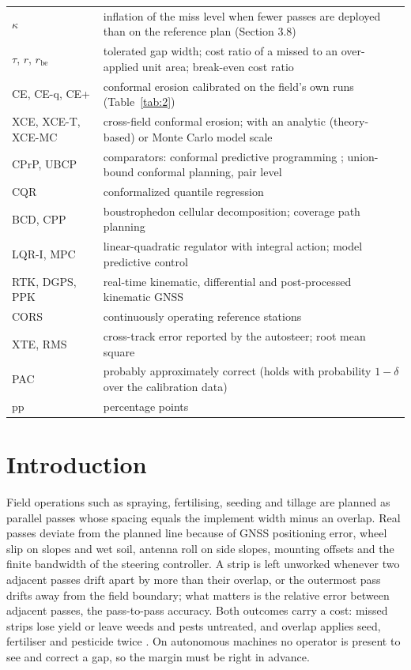 \documentclass[preprint,12pt,authoryear]{elsarticle}
\begin{document}
{\begin{tabularx}{\textwidth}{@{}>{\raggedright\arraybackslash}p{}X@{}}
\(\kappa\) & inflation of the miss level when fewer passes are deployed than on the reference plan (Section 3.8) \\
\(\tau\), \(r\), \(r_\mathrm{be}\) & tolerated gap width; cost ratio of a missed to an over-applied unit area; break-even cost ratio \\
CE, CE-q, CE+ & conformal erosion calibrated on the field's own runs (Table~\ref{tab:2}) \\
XCE, XCE-T, XCE-MC & cross-field conformal erosion; with an analytic (theory-based) or Monte Carlo model scale \\
CPrP, UBCP & comparators: conformal predictive programming \citep{zhao2024}; union-bound conformal planning, pair level \citep{lindemann2023} \\
CQR & conformalized quantile regression \citep{romano2019} \\
BCD, CPP & boustrophedon cellular decomposition; coverage path planning \\
LQR-I, MPC & linear-quadratic regulator with integral action; model predictive control \\
RTK, DGPS, PPK & real-time kinematic, differential and post-processed kinematic GNSS \\
CORS & continuously operating reference stations \\
XTE, RMS & cross-track error reported by the autosteer; root mean square \\
PAC & probably approximately correct (holds with probability \(1-\delta\) over the calibration data) \\
pp & percentage points \\
\bottomrule
\end{tabularx}}

\section{Introduction}

Field operations such as spraying, fertilising, seeding and tillage are planned as parallel passes whose spacing equals the implement width minus an overlap. Real passes deviate from the planned line because of GNSS positioning error, wheel slip on slopes and wet soil, antenna roll on side slopes, mounting offsets and the finite bandwidth of the steering controller. A strip is left unworked whenever two adjacent passes drift apart by more than their overlap, or the outermost pass drifts away from the field boundary; what matters is the relative error between adjacent passes, the pass-to-pass accuracy. Both outcomes carry a cost: missed strips lose yield or leave weeds and pests untreated, and overlap applies seed, fertiliser and pesticide twice \citep{fao2025,zhang2015,zhang2021}. On autonomous machines no operator is present to see and correct a gap, so the margin must be right in advance.
\end{document}

